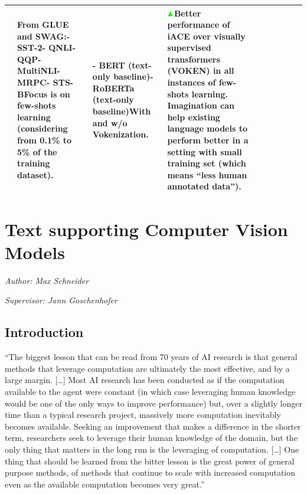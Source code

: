 \documentclass[
]{krantz}
\renewenvironment{quote}{\begin{VF}}{\end{VF}}
\begin{document}
\begin{longtable}[]{@{}llllllllll@{}}
\begin{minipage}[t]{0.25\columnwidth}
\end{minipage} & \begin{minipage}[t]{0.08\columnwidth}\raggedright
From GLUE and SWAG:- SST-2- QNLI- QQP- MultiNLI- MRPC- STS-BFocus is on few-shots learning (considering from 0.1\% to 5\% of the training dataset).\strut
\end{minipage} & \begin{minipage}[t]{0.05\columnwidth}\raggedright
- BERT (text-only baseline)- RoBERTa (text-only baseline)With and w/o Vokenization.\strut
\end{minipage} & \begin{minipage}[t]{0.13\columnwidth}\raggedright
\(\color{green}\blacktriangle\)Better performance of iACE over visually supervised transformers (VOKEN) in all instances of few-shots learning. Imagination can help existing language models to perform better in a setting with small training set (which means ``less human annotated data'').\strut
\end{minipage}\tabularnewline
\bottomrule
\end{longtable}

\hypertarget{c02-04-text-support-img}{%
\section{Text supporting Computer Vision Models}\label{c02-04-text-support-img}}

\emph{Author: Max Schneider}

\emph{Supervisor: Jann Goschenhofer}

\hypertarget{introduction-1}{%
\subsection{Introduction}\label{introduction-1}}

\begin{quote}
``The biggest lesson that can be read from 70 years of AI research is that general methods that leverage computation are ultimately the most effective, and by a large margin.
{[}\ldots{]} Most AI research has been conducted as if the computation available to the agent were constant (in which case leveraging human knowledge would be one of the only ways to improve performance) but, over a slightly longer time than a typical research project, massively more computation inevitably becomes available.
Seeking an improvement that makes a difference in the shorter term, researchers seek to leverage their human knowledge of the domain, but the only thing that matters in the long run is the leveraging of computation.
{[}\ldots{]} One thing that should be learned from the bitter lesson is the great power of general purpose methods, of methods that continue to scale with increased computation even as the available computation becomes very great.''

\end{quote}
\end{document}
